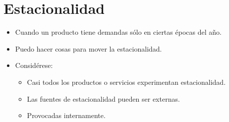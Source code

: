 \section{Estacionalidad}
\begin{itemize}
    \item Cuando un producto tiene demandas sólo en ciertas épocas del año.
    \item Puedo hacer cosas para mover la estacionalidad.
    \item Considérese:
        \begin{itemize}
            \item Casi todos los productos o servicios experimentan estacionalidad.
            \item Las fuentes de estacionalidad pueden ser externas.
            \item Provocadas internamente.  
        \end{itemize}
\end{itemize}


